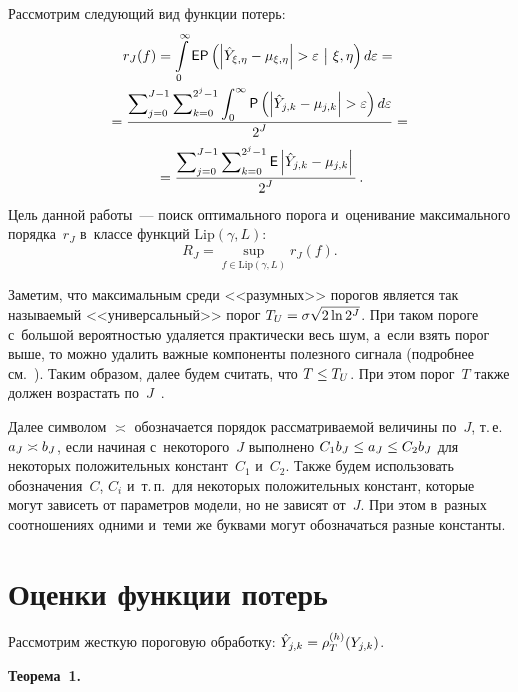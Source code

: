 \begin{multicols}{2}
 Рас\-смот\-рим сле\-ду\-ющий вид функции потерь:
\begin{multline*}
r_J(f)=\int\limits_{0}^{\infty}\e\p\left(\left|
\hat{Y}_{\xi,\eta}-\mu_{\xi,\eta}\right|>\varepsilon\ \big|\ \xi,\eta\right)d\varepsilon={}\\
{}=\fr{\sum\nolimits_{j=0}^{J-1}\sum\nolimits_{k=0}^{2^j-1} \int\nolimits_{0}^{\infty}
\p\left(\left|\hat{Y}_{j,k}-\mu_{j,k}\right|>\varepsilon\right)d\varepsilon}{2^J}={}\\
{}=
\fr{\sum\nolimits_{j=0}^{J-1}\sum\nolimits_{k=0}^{2^j-1} \e\abs{\hat{Y}_{j,k}-\mu_{j,k}}}{2^J}\,.
\end{multline*}
Цель данной работы~--- поиск оптимального порога и~оценивание максимального порядка~$r_J$ 
в~классе функций $\mathrm{Lip}(\gamma,L)$:
\begin{equation}
\label{Risk_Definition}
R_J=\sup\limits_{f\in\mathrm{Lip}(\gamma,L)}{r_J(f)}.
\end{equation}

Заметим, что максимальным среди <<разумных>> порогов является так 
называемый <<универсальный>> порог $T_U\hm=\sigma\sqrt{2\ln 2^J}$.
 При таком пороге с~большой ве\-ро\-ят\-ностью удаляется практически весь шум, 
 а~если взять порог выше, то можно удалить важные компоненты полезного сигнала (подробнее см.~\cite{MAJ98}). 
 Таким образом, далее будем считать, что $T\hm\leq T_U$. При этом порог~$T$ так\-же должен воз\-рас\-тать 
 по~$J$~\cite{Jan01}.

Далее символом $\asymp$ обозначается порядок рас\-смат\-ри\-ва\-емой величины по~$J$, т.\,е.\ 
$a_J\hm\asymp b_J$, если начиная с~некоторого~$J$ выполнено $C_1  b_J\leq a_J
\hm\leq  C_2 b_J$ для некоторых положительных констант~$C_1$ и~$C_2$. Также будем использовать
 обозначения~$C$, $C_i$ и~т.\,п.\ для некоторых положительных констант, которые могут зависеть 
 от па\-ра\-ме\-тров модели, но не зависят от~$J$. При этом в~разных соотношениях одними и~теми же 
 буквами могут обозначаться разные константы.

\section{Оценки функции потерь}

Рассмотрим жесткую пороговую обработку: $\hat{Y}_{j,k}\hm=\rho_T^{(h)}(Y_{j,k})$.

\smallskip

\noindent
\textbf{Теорема~1.}\


\end{multicols}
